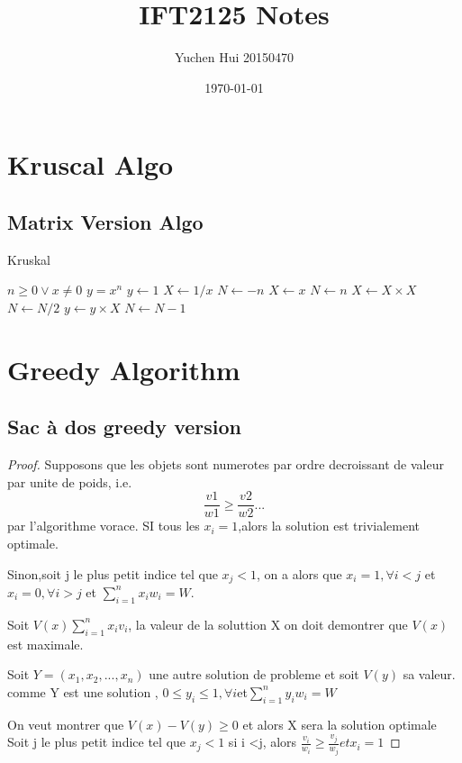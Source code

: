 \documentclass{article}
\title{\textbf{IFT2125 Notes}}
\author{Yuchen Hui 20150470}
\date{\today}
\theoremstyle{definition}
\theoremstyle{remark}
\newcommand{\pr}[1]{\left( #1 \right)}
\begin{document}
    \maketitle
    \tableofcontents
    \section{Kruscal Algo}
    \subsection{Matrix Version Algo}

    \begin{algorithm} 
	\caption{Kruskal} 
	\label{alg3} 
	\begin{algorithmic}
		\REQUIRE $n \geq 0 \vee x \neq 0$ 
		\ENSURE $y = x^n$ 
		\STATE $y \gets 1$ 
		\STATE $X \gets 1 / x$ 
		\STATE $N \gets -n$ 
		\ELSE 
		\STATE $X \gets x$ 
		\STATE $N \gets n$ 
		\ENDIF 
		\STATE $X \gets X \times X$ 
		\STATE $N \gets N / 2$ 
		\ELSE[$N$ is odd] \STATE $y \gets y \times X$ 
		\STATE $N \gets N - 1$ 
		\ENDIF 
		\ENDWHILE 
	\end{algorithmic} 
\end{algorithm}
    \section{Greedy Algorithm}
        \subsection{Sac à dos greedy version}
        \begin{proof}
            Supposons que les objets sont numerotes par ordre
            decroissant de valeur par unite de poids, i.e.
            $$\frac{v1}{w1} \geq\frac{v2}{w2}... $$
            par l'algorithme vorace. SI tous les $x_i = 1$,alors la solution
            est trivialement optimale.

            Sinon,soit j le plus petit indice tel que $x_j < 1$, on a 
            alors que $x_i = 1, \forall i <j$ et $x_i  = 0, \forall i >j$
            et $\sum_{i=1}^n x_iw_i = W$.

            Soit $V\pr{x}\sum_{i=1}^n x_iv_i $, la valeur de la soluttion X
            on doit demontrer que $V\pr{x}$ est maximale.

            Soit $Y = \pr{x_1,x_2,...,x_n}$  une autre solution de probleme et soit $V\pr{y}$ sa valeur.
            comme Y est une solution , $0 \leq y_i \leq 1 ,\forall i $et$ \sum_{i=1}^n y_iw_i = W$
            
            On veut montrer que $V\pr{x} - V\pr{y} \geq 0$ et alors X sera la solution optimale
            Soit j le plus petit indice tel que $x_j < 1$ 
            si i <j, alors $\frac{v_i}{w_i} \geq\frac{v_j}{w_j}  et x_i = 1$

        



        \end{proof}
\end{document}
